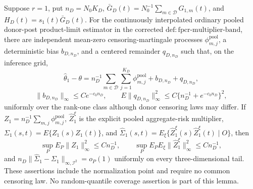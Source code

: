 Suppose \(r=1\), put \(n_D=N_0K_D\), \(\bar G_D(t)=N_0^{-1}\sum_{m\in\mathcal D}G_{1,m}(t)\), and \(H_D(t)=s_1(t)\bar G_D(t)\). For the continuously interpolated ordinary pooled donor-post product-limit estimator in the corrected \(\mathrm{def:fpcr\mbox{-}multiplier\mbox{-}band}\), there are independent mean-zero censoring-martingale processes \(\phi_{m,j}^{\mathrm{pool}}\), a deterministic bias \(b_{D,n_D}\), and a centered remainder \(q_{D,n_D}\) such that, on the inference grid,
\[
 \widehat\theta_1-\theta
 =n_D^{-1}\sum_{m\in\mathcal D}\sum_{j=1}^{K_D}
 \phi_{m,j}^{\mathrm{pool}}+b_{D,n_D}+q_{D,n_D},
\]
\[
 \|b_{D,n_D}\|_\infty\le Ce^{-c_0n_D},
 \qquad E\|q_{D,n_D}\|_\infty^2
 \le C\{n_D^{-1}+e^{-c_0n_D}\}^2,
\]
uniformly over the rank-one class although donor censoring laws may differ. If \(Z_1=n_D^{-1}\sum_{m,j}\phi_{m,j}^{\mathrm{pool}}\), \(\widehat Z_1^\xi\) is the explicit pooled aggregate-risk multiplier, \(\Sigma_1(s,t)=E\{Z_1(s)Z_1(t)\}\), and \(\widehat\Sigma_1(s,t)=E_\xi\{\widehat Z_1^\xi(s)\widehat Z_1^\xi(t)\mid O\}\), then
\[
 \sup_PE_P\|Z_1\|_\infty^2\le Cn_D^{-1},
 \qquad
 \sup_PE_PE_\xi\|\widehat Z_1^\xi\|_\infty^2\le Cn_D^{-1},
\]
and \(n_D\|\widehat\Sigma_1-\Sigma_1\|_{\infty,\mathcal I^2}=o_P(1)\) uniformly on every three-dimensional tail. These assertions include the normalization point and require no common censoring law. No random-quantile coverage assertion is part of this lemma.